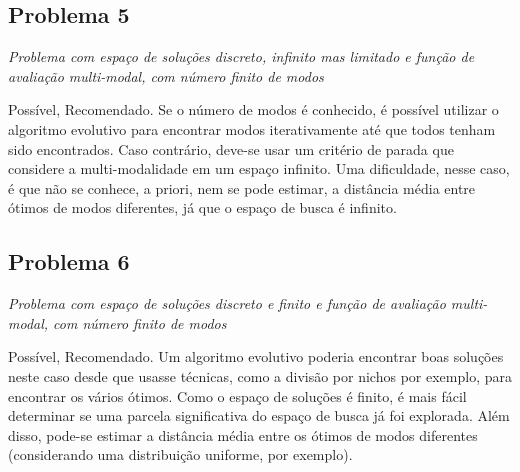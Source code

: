 \documentclass[a4paper]{article}
\begin{document}
\subsection{Problema 5}
\textit{Problema com espaço de soluções discreto, infinito mas limitado e função de avaliação multi-modal, com número finito de modos }

\textsf{Possível}, \textsf{Recomendado}. Se o número de modos é conhecido, é possível utilizar o algoritmo evolutivo para encontrar modos iterativamente até que todos tenham sido encontrados. Caso contrário, deve-se usar um critério de parada que considere a multi-modalidade em um espaço infinito. Uma dificuldade, nesse caso, é que não se conhece, a priori, nem se pode estimar, a distância média entre ótimos de modos diferentes, já que o espaço de busca é infinito. 

\subsection{Problema 6}
\textit{Problema com espaço de soluções discreto e finito e função de avaliação multi-modal, com número finito de modos }

\textsf{Possível}, \textsf{Recomendado}. Um algoritmo evolutivo poderia encontrar boas soluções neste caso desde que usasse técnicas, como a divisão por nichos por exemplo, para encontrar os vários ótimos. Como o espaço de soluções é finito, é mais fácil determinar se uma parcela significativa do espaço de busca já foi explorada. Além disso, pode-se estimar a distância média entre os ótimos de modos diferentes (considerando uma distribuição uniforme, por exemplo).
\end{document}
